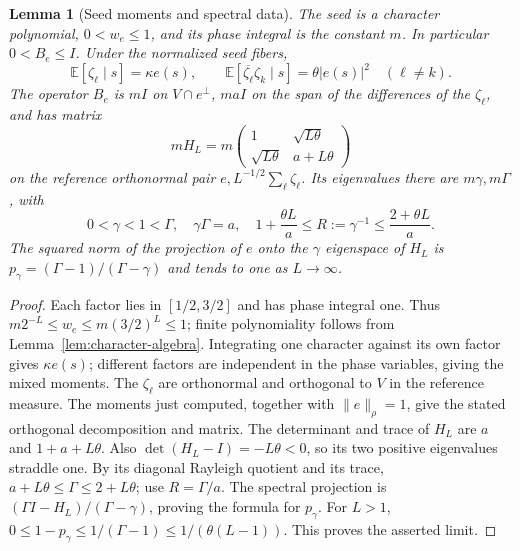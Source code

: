 \documentclass[reqno,a4paper,12pt]{amsart}
\newtheorem{lemma}[theorem]{Lemma}
\theoremstyle{definition}
\newcommand{\E}{\mathbb E}
\begin{document}
\begin{lemma}[Seed moments and spectral data]\label{lem:seed-spectrum}
The seed is a character polynomial, $0<w_e\le1$, and its phase
integral is the constant $m$. In particular $0<B_e\le I$.
Under the normalized seed fibers,
\[
 \E[\zeta_\ell\mid s]=\kappa e(s),\qquad
 \E[\overline{\zeta_\ell}\zeta_k\mid s]=\theta|e(s)|^2
 \quad(\ell\ne k).
\]
The operator $B_e$ is $mI$ on $V\cap e^\perp$, $maI$ on the
span of the differences of the $\zeta_\ell$, and has matrix
\[
 mH_L=m\begin{pmatrix}1&\sqrt{L\theta}\\
 \sqrt{L\theta}&a+L\theta\end{pmatrix}
\]
on the reference orthonormal pair $e,L^{-1/2}\sum_\ell\zeta_\ell$.
Its eigenvalues there are $m\gamma,m\Gamma$, with
\[
 0<\gamma<1<\Gamma,\quad \gamma\Gamma=a,\quad
 1+\frac{\theta L}{a}\le R:=\gamma^{-1}
 \le\frac{2+\theta L}{a}.
\]
The squared norm of the projection of $e$ onto the $\gamma$ eigenspace
of $H_L$ is
$p_\gamma=(\Gamma-1)/(\Gamma-\gamma)$ and tends to one as $L\to\infty$.
\end{lemma}
\begin{proof}
Each factor lies in $[1/2,3/2]$ and has phase integral one.
Thus $m2^{-L}\le w_e\le m(3/2)^L\le1$; finite polynomiality follows
from Lemma~\ref{lem:character-algebra}. Integrating one character
against its own factor gives $\kappa e(s)$; different factors are
independent in the phase variables, giving the mixed moments.
The $\zeta_\ell$ are orthonormal and orthogonal to $V$ in the reference
measure. The moments just computed, together with $\|e\|_\rho=1$,
give the stated orthogonal decomposition and matrix.
The determinant and trace of $H_L$ are $a$ and $1+a+L\theta$.
Also $\det(H_L-I)=-L\theta<0$, so its two positive eigenvalues
straddle one. By its diagonal Rayleigh quotient and its trace,
$a+L\theta\le\Gamma\le2+L\theta$; use $R=\Gamma/a$.
The spectral projection is
$(\Gamma I-H_L)/(\Gamma-\gamma)$, proving the formula for $p_\gamma$.
For $L>1$,
$0\le1-p_\gamma\le1/(\Gamma-1)\le1/(\theta(L-1))$.
This proves the asserted limit.
\end{proof}
\end{document}
